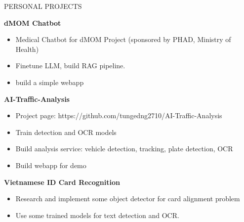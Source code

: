 \documentclass{resume} %
\begin{document}
\begin{rSection}{PERSONAL PROJECTS}
\vspace{-1.25em}
\item \textbf{dMOM Chatbot}
\begin{itemize}
    \itemsep -3pt {}
     \item Medical Chatbot for dMOM Project (sponsored by PHAD, Ministry of Health)
     \item Finetune LLM, build RAG pipeline.
     \item build a simple webapp
 \end{itemize}
\item \textbf{AI-Traffic-Analysis} 
\begin{itemize}
    \itemsep -3pt {} 
    \item Project page: https://github.com/tungedng2710/AI-Traffic-Analysis
    \item Train detection and OCR models
    \item Build analysis service: vehicle detection, tracking, plate detection, OCR
    \item Build webapp for demo
 \end{itemize}
\item \textbf{Vietnamese ID Card Recognition} 
\begin{itemize}
    \itemsep -3pt {} 
     \item Research and implement some object detector for card alignment problem
     \item Use some trained models for text detection and OCR.
 \end{itemize}
\end{rSection} 
\end{document}

